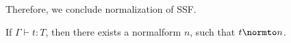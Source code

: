 \noindent Therefore, we conclude normalization of SSF.
\begin{corollary}[Normalization]
  If $\Gamma \vdash t:T$, then there exists a normalform $n$, such
  that $t \normto n$.
\end{corollary}

